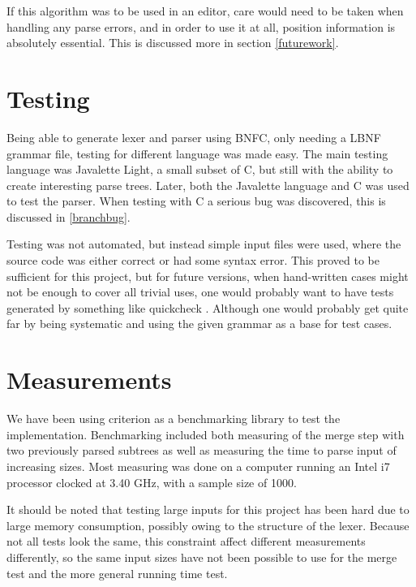 \documentclass[a4paper,12pt,twosided]{report}
\renewcommand\cite{\citep}
\begin{document}
If this algorithm was to be used in an editor, care would need to be taken when
handling any parse errors, and in order to use it at all, position information
is absolutely essential. This is discussed more in section \ref{futurework}.

\section{Testing}
Being able to generate lexer and parser using BNFC, only needing a LBNF grammar
file, testing for different language was made easy. The main testing language
was Javalette Light, a small subset of C, but still with the ability to create
interesting parse trees. Later, both the Javalette language and C was used to
test the parser. When testing with C a serious bug was discovered, this is
discussed in \ref{branchbug}.

Testing was not automated, but instead simple input files were used, where the
source code was either correct or had some syntax error. This proved to be
sufficient for this project, but for future versions, when hand-written cases
might not be enough to cover all trivial uses, one would probably want to have
tests generated by something like quickcheck \cite{quickcheck}. Although one
would probably get quite far by being systematic and using the given grammar as
a base for test cases. 

\section{Measurements}
We have been using criterion \cite{criterion} as a benchmarking library to test
the implementation. Benchmarking included both measuring of the merge step with
two previously parsed subtrees as well as measuring the time to parse input of
increasing sizes. Most measuring was done on a computer running an Intel i7
processor clocked at 3.40 GHz, with a sample size of 1000. 

It should be noted that testing large inputs for this project has been hard due
to large memory consumption, possibly owing to the structure of the lexer.
Because not all tests look the same, this constraint affect different
measurements differently, so the same input sizes have not been possible to use
for the merge test and the more general running time test.
\end{document}
